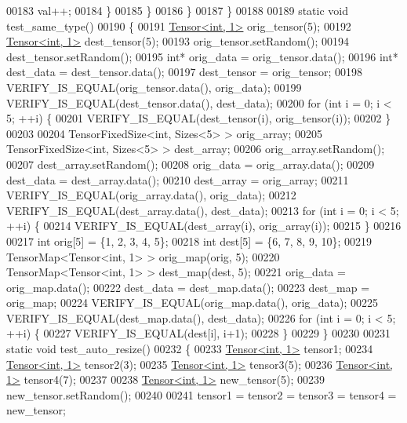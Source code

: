 \begin{DoxyCode}
00183         val++;
00184       \}
00185     \}
00186   \}
00187 \}
00188 
00189 \textcolor{keyword}{static} \textcolor{keywordtype}{void} test\_same\_type()
00190 \{
00191   \hyperlink{class_eigen_1_1_tensor}{Tensor<int, 1>} orig\_tensor(5);
00192   \hyperlink{class_eigen_1_1_tensor}{Tensor<int, 1>} dest\_tensor(5);
00193   orig\_tensor.setRandom();
00194   dest\_tensor.setRandom();
00195   \textcolor{keywordtype}{int}* orig\_data = orig\_tensor.data();
00196   \textcolor{keywordtype}{int}* dest\_data = dest\_tensor.data();
00197   dest\_tensor = orig\_tensor;
00198   VERIFY\_IS\_EQUAL(orig\_tensor.data(), orig\_data);
00199   VERIFY\_IS\_EQUAL(dest\_tensor.data(), dest\_data);
00200   \textcolor{keywordflow}{for} (\textcolor{keywordtype}{int} i = 0; i < 5; ++i) \{
00201     VERIFY\_IS\_EQUAL(dest\_tensor(i), orig\_tensor(i));
00202   \}
00203 
00204   TensorFixedSize<int, Sizes<5> > orig\_array;
00205   TensorFixedSize<int, Sizes<5> > dest\_array;
00206   orig\_array.setRandom();
00207   dest\_array.setRandom();
00208   orig\_data = orig\_array.data();
00209   dest\_data = dest\_array.data();
00210   dest\_array = orig\_array;
00211   VERIFY\_IS\_EQUAL(orig\_array.data(), orig\_data);
00212   VERIFY\_IS\_EQUAL(dest\_array.data(), dest\_data);
00213   \textcolor{keywordflow}{for} (\textcolor{keywordtype}{int} i = 0; i < 5; ++i) \{
00214     VERIFY\_IS\_EQUAL(dest\_array(i), orig\_array(i));
00215   \}
00216 
00217   \textcolor{keywordtype}{int} orig[5] = \{1, 2, 3, 4, 5\};
00218   \textcolor{keywordtype}{int} dest[5] = \{6, 7, 8, 9, 10\};
00219   TensorMap<Tensor<int, 1> > orig\_map(orig, 5);
00220   TensorMap<Tensor<int, 1> > dest\_map(dest, 5);
00221   orig\_data = orig\_map.data();
00222   dest\_data = dest\_map.data();
00223   dest\_map = orig\_map;
00224   VERIFY\_IS\_EQUAL(orig\_map.data(), orig\_data);
00225   VERIFY\_IS\_EQUAL(dest\_map.data(), dest\_data);
00226   \textcolor{keywordflow}{for} (\textcolor{keywordtype}{int} i = 0; i < 5; ++i) \{
00227     VERIFY\_IS\_EQUAL(dest[i], i+1);
00228   \}
00229 \}
00230 
00231 \textcolor{keyword}{static} \textcolor{keywordtype}{void} test\_auto\_resize()
00232 \{
00233   \hyperlink{class_eigen_1_1_tensor}{Tensor<int, 1>} tensor1;
00234   \hyperlink{class_eigen_1_1_tensor}{Tensor<int, 1>} tensor2(3);
00235   \hyperlink{class_eigen_1_1_tensor}{Tensor<int, 1>} tensor3(5);
00236   \hyperlink{class_eigen_1_1_tensor}{Tensor<int, 1>} tensor4(7);
00237 
00238   \hyperlink{class_eigen_1_1_tensor}{Tensor<int, 1>} new\_tensor(5);
00239   new\_tensor.setRandom();
00240 
00241   tensor1 = tensor2 = tensor3 = tensor4 = new\_tensor;

\end{DoxyCode}
